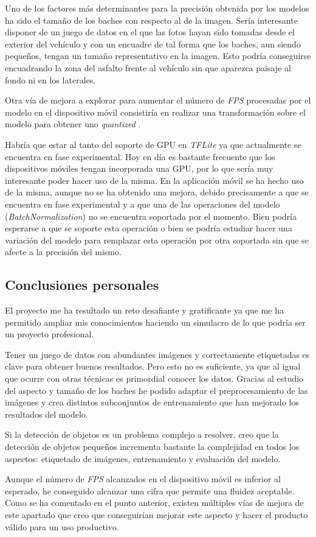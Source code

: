 Uno de los factores más determinantes para la precisión obtenida por los modelos ha sido el tamaño de los baches con respecto al de la imagen. Sería interesante disponer de un juego de datos en el que las fotos hayan sido tomadas desde el exterior del vehículo y con un encuadre de tal forma que los baches, aun siendo pequeños, tengan un tamaño representativo en la imagen. Esto podría conseguirse encuadrando la zona del asfalto frente al vehículo sin que aparezca paisaje al fondo ni en los laterales.

Otra vía de mejora a explorar para aumentar el número de \textit{FPS} procesadas por el modelo en el dispositivo móvil consistiría en realizar una transformación sobre el modelo para obtener uno \textit{quantized} \cite{s8_quantizedmodel}.

Habría que estar al tanto del soporte de GPU en \textit{TFLite} ya que actualmente se encuentra en fase experimental. Hoy en día es bastante frecuente que los dispositivos móviles tengan incorporada una GPU, por lo que sería muy interesante poder hacer uso de la misma. En la aplicación móvil se ha hecho uso de la misma, aunque no se ha obtenido una mejora, debido precisamente a que se encuentra en fase experimental y a que una de las operaciones del modelo (\textit{BatchNormalization}) \cite{s8_batchnormalization} no se encuentra soportada por el momento. Bien podría esperarse a que se soporte esta operación o bien se podría estudiar hacer una variación del modelo para remplazar esta operación por otra soportada sin que se afecte a la precisión del mismo.

\subsection{Conclusiones personales}

El proyecto me ha resultado un reto desafiante y gratificante ya que me ha permitido ampliar mis conocimientos haciendo un simulacro de lo que podría ser un proyecto profesional.

Tener un juego de datos con abundantes imágenes y correctamente etiquetadas es clave para obtener buenos resultados. Pero esto no es suficiente, ya que al igual que ocurre con otras técnicas es primordial conocer los datos. Gracias al estudio del aspecto y tamaño de los baches he podido adaptar el preprocesamiento de las imágenes y crea distintos subconjuntos de entrenamiento que han mejorado los resultados del modelo.

Si la detección de objetos es un problema complejo a resolver, creo que la detección de objetos pequeños incrementa bastante la complejidad en todos los aspectos: etiquetado de imágenes, entrenamiento y evaluación del modelo.

Aunque el número de \textit{FPS} alcanzados en el dispositivo móvil es inferior al esperado, he conseguido alcanzar una cifra que permite una fluidez aceptable. Como se ha comentado en el punto anterior, existen múltiples vías de mejora de este apartado que creo que conseguirían mejorar este aspecto y hacer el producto válido para un uso productivo.